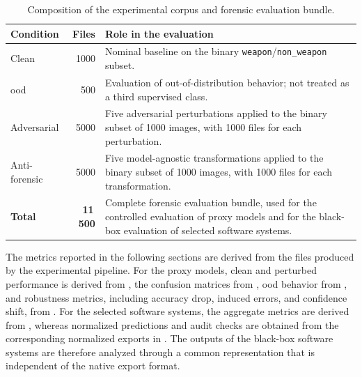 \begin{table}[H]
\centering
\caption{Composition of the experimental corpus and forensic evaluation bundle.}
\label{tab:results-corpus-composition}
\begin{tabularx}{0.90\textwidth}{@{}l r X@{}}
\toprule
\textbf{Condition} & \textbf{Files} & \textbf{Role in the evaluation} \\
\midrule

Clean
&
1000
&
Nominal baseline on the binary \texttt{weapon}/\texttt{non\_weapon} subset. \\

\gls{ood}
&
500
&
Evaluation of out-of-distribution behavior; not treated as a third supervised
class. \\

Adversarial
&
5000
&
Five adversarial perturbations applied to the binary subset of 1000 images,
with 1000 files for each perturbation. \\

Anti-forensic
&
5000
&
Five model-agnostic transformations applied to the binary subset of 1000
images, with 1000 files for each transformation. \\

\midrule
\textbf{Total}
&
\textbf{11\,500}
&
Complete forensic evaluation bundle, used for the controlled evaluation of
proxy models and for the black-box evaluation of selected software systems. \\

\bottomrule
\end{tabularx}
\end{table}

The metrics reported in the following sections are derived from the files
produced by the experimental pipeline. For the proxy models, clean and
perturbed performance is derived from
, the confusion matrices from
, \gls{ood} behavior
from , and robustness metrics,
including accuracy drop, induced errors, and confidence shift, from
. For the selected
software systems, the aggregate metrics are derived from
, whereas normalized
predictions and audit checks are obtained from the corresponding normalized
exports in . The outputs of the black-box
software systems are therefore analyzed through a common representation that is
independent of the native export format.


